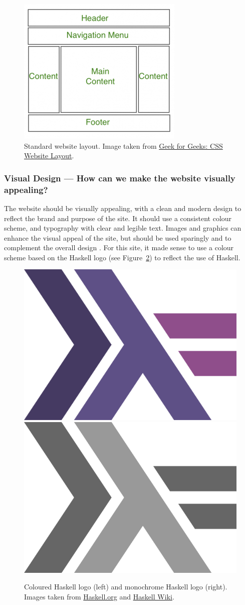 \documentclass[../main.tex]{subfiles}
\begin{document}
                \begin{figure}[H]
                    \centering
                    \includegraphics[width=0.35\linewidth]{images/webLayout.png}
                        \caption{Standard website layout.
                            Image taken from \href{https://www.geeksforgeeks.org/css-website-layout/}{Geek
                                    for Geeks: CSS Website Layout}.
                        }
                        \label{fig:webLayout}
                \end{figure}

            \subsubsection{Visual Design — How can we make the website visually appealing?}
                The website should be visually appealing, with a clean and modern design to
                    reflect the brand and purpose of the site.
                It should use a consistent colour scheme, and typography with clear and legible
                    text.
                Images and graphics can enhance the visual appeal of the site, but should be
                    used sparingly and to complement the overall design \citep{images}.
                For this site, it made sense to use a colour scheme based on the Haskell logo
                    (see Figure~\ref{fig:haskell}) to reflect the use of Haskell.

                \begin{figure}[H]
                    \centering
                    \includegraphics[width=0.2\linewidth]{images/haskell.png}
                    \includegraphics[width=0.2\linewidth]{images/haskellGrey.png}
                        \caption{Coloured Haskell logo (left) and monochrome Haskell logo (right).
                            Images taken from \href{https://www.haskell.org/}{Haskell.org} and
                                \href{https://wiki.haskell.org/Haskell_logos}{Haskell Wiki}.
                        }
                        \label{fig:haskell}
                \end{figure}
\end{document}
